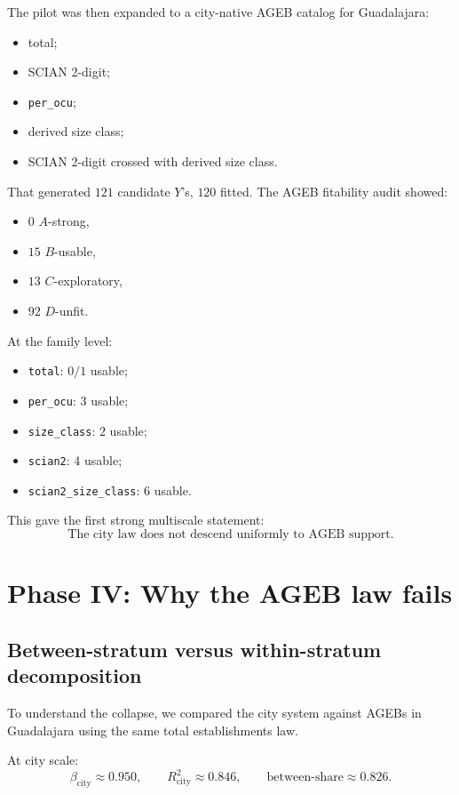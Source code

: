 \documentclass[11pt]{article}
\begin{document}
The pilot was then expanded to a city-native AGEB catalog for Guadalajara:
\begin{itemize}
\item total;
\item SCIAN 2-digit;
\item \texttt{per\_ocu};
\item derived size class;
\item SCIAN 2-digit crossed with derived size class.
\end{itemize}

That generated \(121\) candidate \(Y\)'s, \(120\) fitted. The AGEB fitability audit showed:
\begin{itemize}
\item \(0\) \(A\)-strong,
\item \(15\) \(B\)-usable,
\item \(13\) \(C\)-exploratory,
\item \(92\) \(D\)-unfit.
\end{itemize}

At the family level:
\begin{itemize}
\item \texttt{total}: \(0/1\) usable;
\item \texttt{per\_ocu}: \(3\) usable;
\item \texttt{size\_class}: \(2\) usable;
\item \texttt{scian2}: \(4\) usable;
\item \texttt{scian2\_size\_class}: \(6\) usable.
\end{itemize}

This gave the first strong multiscale statement:
\begin{equation}
\text{The city law does not descend uniformly to AGEB support.}
\end{equation}

\section{Phase IV: Why the AGEB law fails}

\subsection{Between-stratum versus within-stratum decomposition}

To understand the collapse, we compared the city system against AGEBs in Guadalajara using the same total establishments law.

At city scale:
\begin{equation}
\beta_{\mathrm{city}} \approx 0.950,
\qquad
R^2_{\mathrm{city}} \approx 0.846,
\qquad
\text{between-share} \approx 0.826.
\end{equation}
\end{document}
